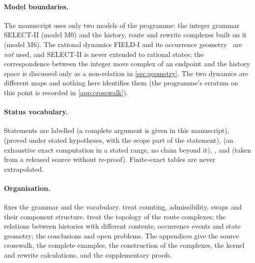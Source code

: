 \paragraph{Model boundaries.}
The manuscript uses only two models of the programme: the integer grammar SELECT-II (model M0) and the history, route and rewrite complexes built on it (model M6). The rational dynamics FIELD-I and its occurrence geometry~\cite{FoundII} are \emph{not} used, and SELECT-II is never extended to rational states; the correspondence between the integer move complex of an endpoint and the history space is discussed only as a non-relation in \cref{sec:geometry}. The two dynamics are different maps and nothing here identifies them (the programme's erratum on this point is recorded in \cref{app:crosswalk}).

\paragraph{Status vocabulary.}
Statements are labelled  (a complete argument is given in this manuscript),  (proved under stated hypotheses, with the scope part of the statement),  (an exhaustive exact computation in a stated range, no claim beyond it), ,  and  (taken from a released source without re-proof). Finite-exact tables are never extrapolated.

\paragraph{Organisation.}  fixes the grammar and the vocabulary.  treat counting, admissibility, swaps and their component structure.  treat the topology of the route complexes;  the relations between histories with different contents;  occurrence events and state geometry;  the conclusions and open problems. The appendices give the source crosswalk, the complete examples, the construction of the complexes, the kernel and rewrite calculations, and the supplementary proofs.
